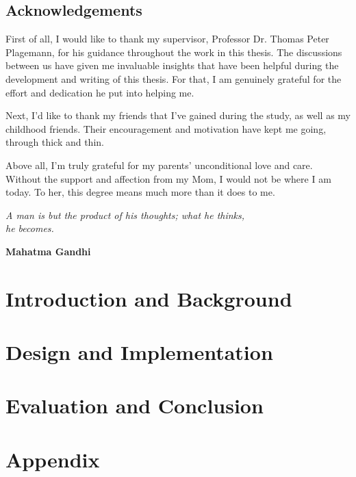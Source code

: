 \documentclass[UKenglish]{ifimaster}  %
\begin{document}
\chapter*{Acknowledgements}
First of all, I would like to thank my supervisor, Professor Dr. Thomas Peter Plagemann, for his guidance throughout the work in this thesis. The discussions between us have given me invaluable insights that have been helpful during the development and writing of this thesis. For that, I am genuinely grateful for the effort and dedication he put into helping me. 

Next, I'd like to thank my friends that I've gained during the study, as well as my childhood friends. Their encouragement and motivation have kept me going, through thick and thin. 

Above all, I'm truly grateful for my parents' unconditional love and care. Without the support and affection from my Mom, I would not be where I am today. To her, this degree means much more than it does to me.

\vspace*{\fill}

\epigraph{\hfill{\textit{A man is but the product of his thoughts; what he thinks, \\he becomes.}}}{\textbf{Mahatma Gandhi}}

\tableofcontents

\listoftables

\listoffigures

\lstlistoflistings

\mainmatter{}

\part{Introduction and Background}




\part{Design and Implementation}



\part{Evaluation and Conclusion}





\part*{Appendix}

\appendix{}


\backmatter{}
\printbibliography
\end{document}
